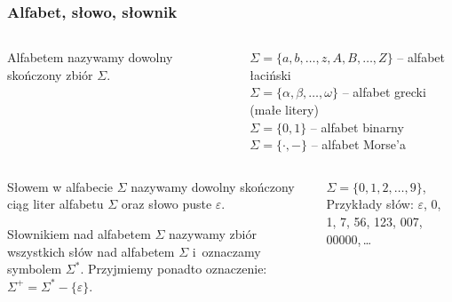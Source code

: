 \documentclass[8pt]{beamer}
\begin{document}
\begin{frame}[t]
\frametitle{Alfabet, słowo, słownik} 
\begin{columns}
\begin{alertblock}{}
\alert{Alfabetem} nazywamy dowolny skończony zbiór $\Sigma$.
\end{alertblock}

\begin{exampleblock}{}
$\Sigma = \{a,b,\dots,z,A,B,\dots,Z\}$ -- alfabet łaciński\\
$\Sigma = \{\alpha,\beta,\dots,\omega\}$ -- alfabet grecki (małe litery)\\
$\Sigma = \{0,1\}$ -- alfabet binarny\\
$\Sigma = \{\cdot,-\}$ -- alfabet Morse'a
\end{exampleblock}
\end{columns}
\pause
\begin{columns}
\begin{alertblock}{}
\alert{Słowem} w alfabecie $\Sigma$ nazywamy dowolny skończony ciąg liter alfabetu $\Sigma$ oraz \alert{słowo puste} $\varepsilon$. 

\alert{Słownikiem nad alfabetem} $\Sigma$ nazywamy zbiór wszystkich słów nad alfabetem $\Sigma$ i~oznaczamy symbolem $\Sigma^{*}$. Przyjmiemy ponadto oznaczenie: $\Sigma^{+} = \Sigma^{*} - \{\varepsilon\}$.
\end{alertblock}

\begin{exampleblock}{}
$\Sigma = \{0,1,2,\dots,9\}$, Przykłady słów: $\varepsilon$, 0, 1, 7, 56, 123, 007, 00000,\,\dots
\end{exampleblock}

\end{columns}

\end{frame}

\end{document}
